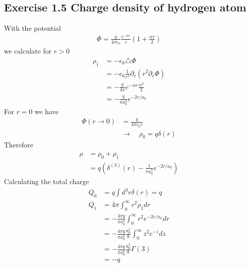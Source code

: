 \documentclass[10pt,a4paper]{book}
\theoremstyle{definition}
\begin{document}
\subsection{Exercise 1.5 Charge density of hydrogen atom}
With the potential
\begin{align}
\Phi=\frac{q}{4\pi\epsilon_0}\frac{e^{-\alpha r}}{r}\left(1+\frac{\alpha r}{2}\right)
\end{align}
we calculate for $r>0$
\begin{align}
\rho_1
&=-\epsilon_0\triangle\Phi\\
&=-\epsilon_0\frac{1}{r^2}\partial_r(r^2\partial_r\Phi)\\
&=-\frac{q}{4\pi}e^{-\alpha r}\frac{\alpha^3}{2}\\
&=-\frac{q}{\pi a_0^3}e^{-2r/a_0}
\end{align}
For $r=0$ we have
\begin{align}
\Phi(r\rightarrow0)&=\frac{q}{4\pi\epsilon_0r}\\
&\rightarrow\quad \rho_0=q\delta(r)
\end{align}
Therefore
\begin{align}
\rho&=\rho_0+\rho_1\\
&=q\left(\delta^{(3)}(r)-\frac{1}{\pi a_0^3}e^{-2r/a_0}\right)
\end{align}
Calculating the total charge
\begin{align}
Q_0&=q\int d^3r\delta(r)=q\\
Q_1
&=4\pi\int_0^\infty r^2\rho_1 dr\\
&=-\frac{4\pi q}{\pi a_0^3}\int_0^\infty r^2e^{-2r/a_0}dr\\
&=-\frac{4\pi q}{\pi a_0^3}\frac{a_0^3}{8}\int_0^\infty z^2e^{-z}dz\\
&=-\frac{4\pi q}{\pi a_0^3}\frac{a_0^3}{8}\Gamma(3)\\
&=-q
\end{align}
\end{document}
